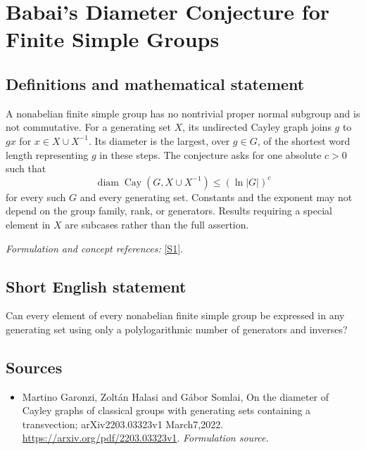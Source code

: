 \documentclass[11pt]{article}
\begin{document}
\section*{\texorpdfstring{Babai's Diameter Conjecture for Finite Simple Groups}{Babai's Diameter Conjecture for Finite Simple Groups}}\label{statement}
\subsection{Definitions and mathematical statement}
A nonabelian finite simple group has no nontrivial proper normal subgroup and is not commutative. For a generating set $X$, its undirected Cayley graph joins $g$ to $gx$ for $x\in X\cup X^{-1}$. Its diameter is the largest, over $g\in G$, of the shortest word length representing $g$ in these steps. The conjecture asks for one absolute $c>0$ such that
\[
 \operatorname{diam}\operatorname{Cay}(G,X\cup X^{-1})\le(\ln|G|)^c
\]
for every such $G$ and every generating set. Constants and the exponent may not depend on the group family, rank, or generators. Results requiring a special element in $X$ are subcases rather than the full assertion.
\par\smallskip\textit{Formulation and concept references:} \href{https://arxiv.org/pdf/2203.03323v1}{[S1]}.

\subsection{Short English statement}
Can every element of every nonabelian finite simple group be expressed in any generating set using only a polylogarithmic number of generators and inverses?
\subsection{Sources}
\begin{itemize}
\item[S1]Martino Garonzi, Zoltán Halasi and Gábor Somlai, On the diameter of Cayley graphs of classical groups with generating sets containing a transvection; arXiv2203.03323v1 March7,2022.
\url{https://arxiv.org/pdf/2203.03323v1}.
\textit{Formulation source.}
\end{itemize}
\end{document}

